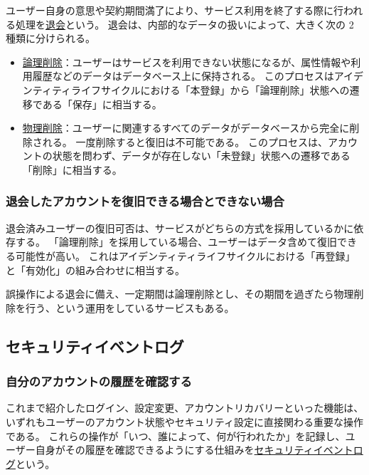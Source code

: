 \documentclass[uplatex]{jsarticle}
\def\label#1{}%
\begin{document}
\begin{dfn}\label{dfn:account-deletion}
ユーザー自身の意思や契約期間満了により、サービス利用を終了する際に行われる処理を\underline{退会}という。
退会は、内部的なデータの扱いによって、大きく次の 2 種類に分けられる。
\begin{itemize}
\item \underline{論理削除}：ユーザーはサービスを利用できない状態になるが、属性情報や利用履歴などのデータはデータベース上に保持される。
このプロセスはアイデンティティライフサイクルにおける「本登録」から「論理削除」状態への遷移である「保存」に相当する。
\item \underline{物理削除}：ユーザーに関連するすべてのデータがデータベースから完全に削除される。
一度削除すると復旧は不可能である。
このプロセスは、アカウントの状態を問わず、データが存在しない「未登録」状態への遷移である「削除」に相当する。
\end{itemize}
\end{dfn}

\subsubsection{退会したアカウントを復旧できる場合とできない場合}

退会済みユーザーの復旧可否は、サービスがどちらの方式を採用しているかに依存する。
「論理削除」を採用している場合、ユーザーはデータ含めて復旧できる可能性が高い。
これはアイデンティティライフサイクルにおける「再登録」と「有効化」の組み合わせに相当する。

\begin{exa}[論理削除の後に物理削除を行う運用]\label{exa:ch3-grace-period}
誤操作による退会に備え、一定期間は論理削除とし、その期間を過ぎたら物理削除を行う、という運用をしているサービスもある。
\end{exa}

\subsection{セキュリティイベントログ}

\subsubsection{自分のアカウントの履歴を確認する}

\begin{dfn}[セキュリティイベントログ]\label{dfn:security-event-log}
これまで紹介したログイン、設定変更、アカウントリカバリーといった機能は、いずれもユーザーのアカウント状態やセキュリティ設定に直接関わる重要な操作である。
これらの操作が「いつ、誰によって、何が行われたか」を記録し、ユーザー自身がその履歴を確認できるようにする仕組みを\underline{セキュリティイベントログ}という。
\end{dfn}
\end{document}
